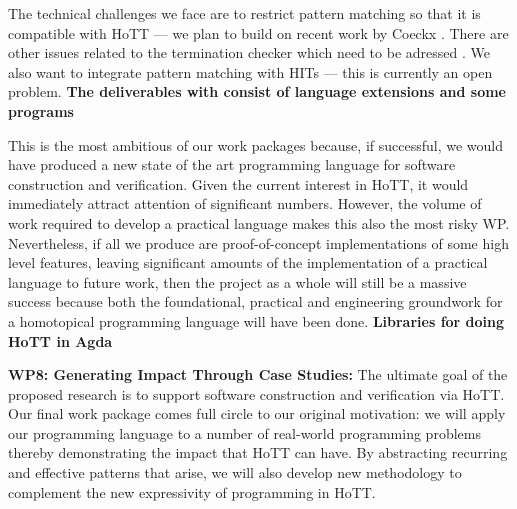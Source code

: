 \documentclass[a4paper,11pt]{article}
\begin{document}
The technical challenges we face are to restrict pattern matching so
that it is compatible with HoTT --- we plan to build on recent work
by Coeckx \cite{coeckx-without-k}. There are other issues
related to the termination checker which need to be adressed
\cite{coq-agda-issue-w-termination}. We also want to integrate pattern
matching with HITs --- this is currently an open problem. {\bf The
deliverables with consist of language extensions and some programs}

This is the most ambitious of our work packages because, if successful,
we would have produced a new state of the art programming language for
software construction and verification. Given the current interest in
HoTT, it would immediately attract attention of significant
numbers. However, the volume of work required to develop a practical
language makes this also the most risky WP. Nevertheless, if all we
produce are proof-of-concept implementations of some high level
features, leaving significant amounts of the implementation of a
practical language to future work, then the project as a whole will
still be a massive success because both the foundational, practical
and engineering groundwork for a homotopical programming language will
have been done. {\bf Libraries for doing HoTT in Agda}






{\bf WP8: Generating Impact Through Case Studies:} The ultimate goal
of the proposed research is to support software construction and
verification via HoTT. Our final work package comes full circle to our
original motivation: we will apply our programming language to a
number of real-world programming problems thereby demonstrating the
impact that HoTT can have. By abstracting recurring and effective
patterns that arise, we will also develop new methodology to
complement the new expressivity of programming in HoTT.
\end{document}
